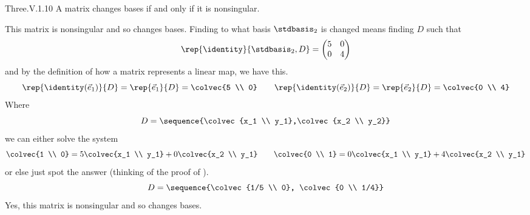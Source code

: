 \begin{ans}{Three.V.1.10}
       A matrix changes bases if and only if it is nonsingular.
       \begin{exparts}
        \partsitem This matrix is nonsingular and so changes bases.
          Finding to what basis \( \stdbasis_2 \) is changed
          means finding $D$ such that
          \begin{equation*}
            \rep{\identity}{\stdbasis_2,D}=
            \begin{pmatrix}
                 5  &0  \\
                 0  &4
            \end{pmatrix}
          \end{equation*}
          and by the definition of how a matrix represents a linear map,
          we have this.
          \begin{equation*}
            \rep{\identity(\vec{e}_1)}{D}=\rep{\vec{e}_1}{D}=\colvec{5 \\ 0}
            \qquad
            \rep{\identity(\vec{e}_2)}{D}=\rep{\vec{e}_2}{D}=\colvec{0 \\ 4}
          \end{equation*}
          Where
          \begin{equation*}
            D=\sequence{\colvec{x_1 \\ y_1},\colvec{x_2 \\ y_2}}
          \end{equation*}
          we can either solve the system
          \begin{equation*}
            \colvec{1 \\ 0}
            =5\colvec{x_1 \\ y_1}+0\colvec{x_2 \\ y_1}
            \qquad
            \colvec{0 \\ 1}
            =0\colvec{x_1 \\ y_1}+4\colvec{x_2 \\ y_1}
          \end{equation*}
          or else just spot the answer
          (thinking of the proof of ).
          \begin{equation*}
            D=\sequence{\colvec{1/5 \\ 0},
                        \colvec{0 \\ 1/4}}
          \end{equation*}
        \partsitem Yes, this matrix is nonsingular and so changes bases.

\end{exparts}
\end{ans}
